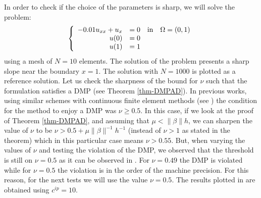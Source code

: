 In order to check if the choice of the parameters is sharp, we will solve the problem:
\begin{align*}
\left\{
\begin{array}{rlr}
-0.01 u_{xx}+u_x &= 0 & {\rm in}\quad \Omega=(0,1)\\
 u(0) & = 0 &\\
 u(1) & = 1 &
  \end{array}
 \right.
\end{align*}
using a mesh of $N=10$ elements. The solution of the problem presents a sharp slope near the boundary $x=1$. The solution with $N=1000$ is plotted as a reference solution. Let us check the sharpness of the bound for $\nu$ such that the formulation satisfies a DMP (see Theorem \ref{thm-DMPAD}). In previous works, using similar schemes with continuous finite element methods (see \cite{ourpaper,burman_nonlinear_2007}) the condition for the method to enjoy a DMP was $\nu\geq 0.5$. In this case, if we look at the proof of Theorem \ref{thm-DMPAD}, and assuming that $\mu<\|\beta\|h$, we can sharpen the value of $\nu$ to be $\nu>0.5+\mu\|\beta\|^{-1}h^{-1} $ (instead of $\nu>1$ as stated in the theorem) which in this particular case means $\nu > 0.55$. But, when varying the values of $\nu$ and testing the violation of the DMP, we observed that the threshold is still on $\nu=0.5$ as it can be observed in . For $\nu=0.49$ the DMP is violated while for $\nu=0.5$ the violation is in the order of the machine precision. For this reason, for the next tests we will use the value $\nu = 0.5$. The results plotted in  are obtained using $c^{ip}=10$. %
\begin{figure}
\centering
{}%
\caption{}\label{fig-sharpnessnu}
\end{figure}

